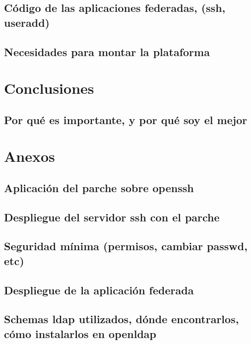     \subsection{Código de las aplicaciones federadas, (ssh, useradd)}
    \subsection{Necesidades para montar la plataforma}

\newpage


\section{Conclusiones}
    \subsection{Por qué es importante, y por qué soy el mejor}

\newpage


\section{Anexos}
    \subsection{Aplicación del parche sobre openssh}
    \subsection{Despliegue del servidor ssh con el parche}
    \subsection{Seguridad mínima (permisos, cambiar passwd, etc)}
    \subsection{Despliegue de la aplicación federada}
    \subsection{Schemas ldap utilizados, dónde encontrarlos, cómo instalarlos
    en openldap}

\newpage



